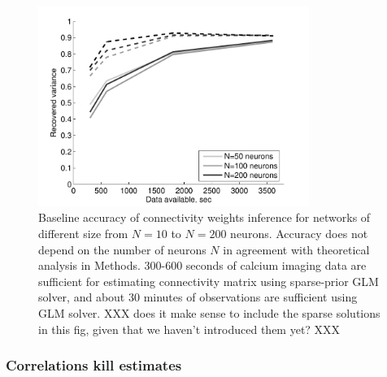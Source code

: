 \begin{figure}[h]
\centering
\includegraphics[width=250pt]{../figs/Figure6c_perf_vs_N}
\caption{Baseline accuracy of connectivity weights inference for networks of different size from $N=10$ to $N=200$ neurons. Accuracy does not depend on the number of neurons $N$ in agreement with theoretical analysis in Methods. 300-600 seconds of calcium imaging data are sufficient for estimating connectivity matrix using sparse-prior GLM solver, and about 30 minutes of observations are sufficient using GLM solver. XXX  does it make sense to include the sparse solutions in this fig, given that we haven't introduced them yet? XXX}
\label{fig:data-n}
\end{figure}


\clearpage
\subsubsection{Correlations kill estimates}

